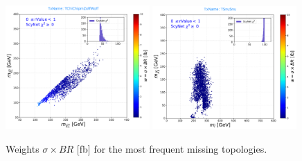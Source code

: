 \documentclass[a4paper,11pt]{article}
\begin{document}
\begin{figure}[!b]
	\subfigure
	{\includegraphics[width=0.49\textwidth]{Fig/Res/Missing_Weights/TChiChipmZoff_Woff.pdf}}	
	\subfigure
	{\includegraphics[width=0.49\textwidth]{Fig/Res/Missing_Weights/TSnuSnu.pdf}}	
	
	
	\caption{Weights $\sigma \times BR$ [fb] for the most frequent missing topologies.}
	\label{masses}
\end{figure}
\end{document}
